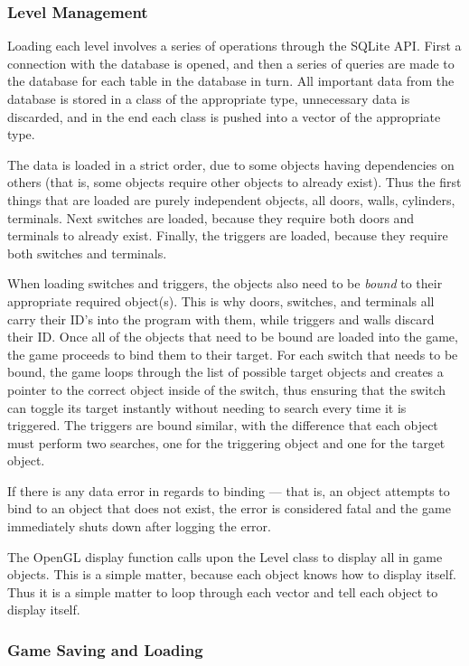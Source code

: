 \documentclass{article}
\begin{document}
\subsubsection{Level Management} \label{subsubsec:load}

Loading each level involves a series of operations through the SQLite API. First a connection with the database is opened, and then a series of queries are made to the database for each table in the database in turn. All important data from the database is stored in a class of the appropriate type, unnecessary data is discarded, and in the end each class is pushed into a vector of the appropriate type. 

The data is loaded in a strict order, due to some objects having dependencies on others (that is, some objects require other objects to already exist). Thus the first things that are loaded are purely independent objects, all doors, walls, cylinders, terminals. Next switches are loaded, because they require both doors and terminals to already exist. Finally, the triggers are loaded, because they require both switches and terminals.

When loading switches and triggers, the objects also need to be \emph{bound} to their appropriate required object(s). This is why doors, switches, and terminals all carry their ID's into the program with them, while triggers and walls discard their ID. Once all of the objects that need to be bound are loaded into the game, the game proceeds to bind them to their target. For each switch that needs to be bound, the game loops through the list of possible target objects and creates a pointer to the correct object inside of the switch, thus ensuring that the switch can toggle its target instantly without needing to search every time it is triggered. The triggers are bound similar, with the difference that each object must perform two searches, one for the triggering object and one for the target object.

If there is any data error in regards to binding --- that is, an object attempts to bind to an object that does not exist, the error is considered fatal and the game immediately shuts down after logging the error.

The OpenGL display function calls upon the Level class to display all in game objects. This is a simple matter, because each object knows how to display itself. Thus it is a simple matter to loop through each vector and tell each object to display itself.

\subsubsection{Game Saving and Loading} \label{subsubsec:saveload}
\end{document}
